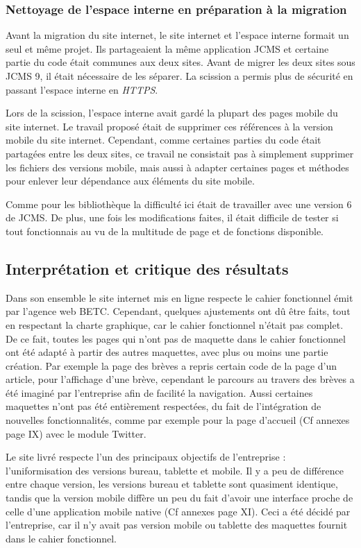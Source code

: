 \documentclass[12pt,a4paper]{article}
\begin{document}
\subsubsection{Nettoyage de l'espace interne en préparation à la migration}
Avant la migration du site internet, le site internet et l'espace interne formait un seul et même projet. Ils partageaient la même application \gls{JCMS} et certaine partie du code était communes aux deux sites. Avant de migrer les deux sites sous \gls{JCMS} 9, il était nécessaire de les séparer. La scission a permis plus de sécurité en passant l'espace interne en \textit{HTTPS}.\par 
Lors de la scission, l'espace interne avait gardé la plupart des pages mobile du site internet. Le travail proposé était de supprimer ces références à la version mobile du site internet. Cependant, comme certaines parties du code était partagées entre les deux sites, ce travail ne consistait pas à simplement supprimer les fichiers des versions mobile, mais aussi à adapter certaines pages et méthodes pour enlever leur dépendance aux éléments du site mobile.\par 
Comme pour les bibliothèque la difficulté ici était de travailler avec une version 6 de \gls{JCMS}. De plus, une fois les modifications faites, il était difficile de tester si tout fonctionnais au vu de la multitude de page et de fonctions disponible.\par

\newpage
\subsection{Interprétation et critique des résultats}
Dans son ensemble le site internet mis en ligne respecte le cahier fonctionnel émit par l'agence web BETC. Cependant, quelques ajustements ont dû être faits, tout en respectant la charte graphique, car le cahier fonctionnel n'était pas complet. De ce fait, toutes les pages qui n'ont pas de maquette dans le cahier fonctionnel ont été adapté à partir des autres maquettes, avec plus ou moins une partie création. Par exemple la page des brèves a repris certain code de la page d'un article, pour l'affichage d'une brève, cependant le parcours au travers des brèves a été imaginé par l'entreprise afin de facilité la navigation. Aussi certaines maquettes n'ont pas été entièrement respectées, du fait de l'intégration de nouvelles fonctionnalités, comme par exemple pour la page d'accueil (Cf annexes page IX) avec le module Twitter. \par
Le site livré respecte l'un des principaux objectifs de l'entreprise : l'uniformisation des versions bureau, tablette et mobile. Il y a peu de différence entre chaque version, les versions bureau et tablette sont quasiment identique, tandis que la version mobile diffère un peu du fait d'avoir une interface proche de celle d'une application mobile native (Cf annexes page XI). Ceci a été décidé par l'entreprise, car il n'y avait pas version mobile ou tablette des maquettes fournit dans le cahier fonctionnel.\par 
\end{document}
